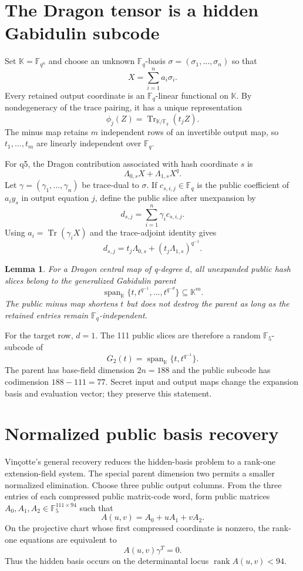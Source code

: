 \documentclass[10pt,a4paper]{article}
\newtheorem{lemma}{Lemma}
\newcommand{\F}{\mathbb{F}}
\newcommand{\K}{\mathbb{K}}
\newcommand{\Tr}{\operatorname{Tr}}
\newcommand{\rank}{\operatorname{rank}}
\newcommand{\Span}{\operatorname{span}}
\begin{document}
\section{The Dragon tensor is a hidden Gabidulin subcode}

Set $\K=\F_{q^n}$ and choose an unknown $\F_q$-basis
$\sigma=(\sigma_1,\ldots,\sigma_n)$ so that
\[
                  X=\sum_{i=1}^n a_i\sigma_i.
\]
Every retained output coordinate is an $\F_q$-linear functional on $\K$.
By nondegeneracy of the trace pairing, it has a unique representation
\[
                  \phi_j(Z)=\Tr_{\K/\F_q}(t_jZ).
\]
The minus map retains $m$ independent rows of an invertible output map, so
$t_1,\ldots,t_m$ are linearly independent over $\F_q$.

For q5, the Dragon contribution associated with hash coordinate $s$ is
\[
             \Lambda_{0,s}X+\Lambda_{1,s}X^q.
\]
Let $\gamma=(\gamma_1,\ldots,\gamma_n)$ be trace-dual to $\sigma$.  If
$c_{s,i,j}\in\F_q$ is the public coefficient of $a_i y_s$ in output
equation $j$, define the public slice after unexpansion by
\[
                  d_{s,j}=\sum_{i=1}^n\gamma_i c_{s,i,j}.
\]
Using $a_i=\Tr(\gamma_iX)$ and the trace-adjoint identity gives
\[
 d_{s,j}=t_j\Lambda_{0,s}+
          (t_j\Lambda_{1,s})^{q^{-1}}.
\]

\begin{lemma}
For a Dragon central map of q-degree $d$, all unexpanded public hash slices
belong to the generalized Gabidulin parent
\[
  \Span_{\K}\{t,t^{q^{-1}},\ldots,t^{q^{-d}}\}\subseteq\K^m.
\]
The public minus map shortens $t$ but does not destroy the parent as long as
the retained entries remain $\F_q$-independent.
\end{lemma}

For the target row, $d=1$.  The 111 public slices are therefore a random
$\F_5$-subcode of
\[
                  G_2(t)=\Span_{\K}\{t,t^{q^{-1}}\}.
\]
The parent has base-field dimension $2n=188$ and the public subcode has
codimension $188-111=77$.  Secret input and output maps change the expansion
basis and evaluation vector; they preserve this statement.

\section{Normalized public basis recovery}

Vin\c{c}otte's general recovery reduces the hidden-basis problem to a
rank-one extension-field system.  The special parent dimension two permits a
smaller normalized elimination.  Choose three public output columns.  From
the three entries of each compressed public matrix-code word, form public
matrices $A_0,A_1,A_2\in\F_5^{111\times94}$ such that
\[
                 A(u,v)=A_0+uA_1+vA_2.
\]
On the projective chart whose first compressed coordinate is nonzero, the
rank-one equations are equivalent to
\[
                 A(u,v)\gamma^T=0.
\]
Thus the hidden basis occurs on the determinantal locus
$\rank A(u,v)<94$.
\end{document}
